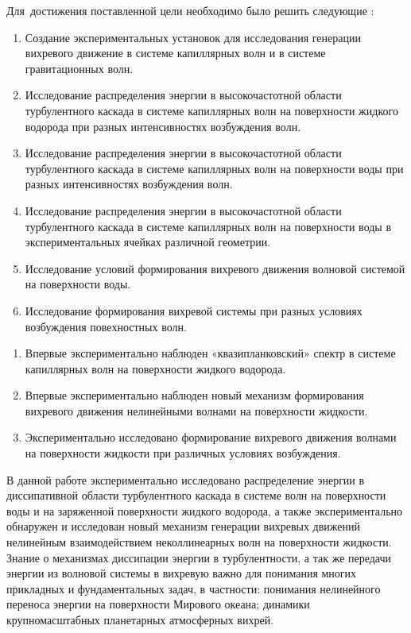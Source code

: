 Для~достижения поставленной цели необходимо было решить следующие {\tasks}:
\begin{enumerate}
	\item Создание экспериментальных установок для исследования генерации вихревого движение в системе капиллярных волн и в системе гравитационных волн.
	\item Исследование распределения энергии в высокочастотной области турбулентного каскада в системе капиллярных волн на поверхности жидкого водорода при разных интенсивностях возбуждения волн.
	\item Исследование распределения энергии в высокочастотной области турбулентного каскада в системе капиллярных волн на поверхности воды при разных интенсивностях возбуждения волн.
	\item Исследование распределения энергии в высокочастотной области турбулентного каскада в системе капиллярных волн на поверхности воды в экспериментальных ячейках различной геометрии.
	\item Исследование условий формирования вихревого движения волновой системой на поверхности воды.
	\item Исследование формирования вихревой системы при разных условиях
возбуждения повехностных волн.
\end{enumerate}

{\novelty}
\begin{enumerate}
	\item Впервые экспериментально наблюден «квазипланковский» спектр в системе капиллярных волн на поверхности жидкого водорода.
	\item Впервые экспериментально наблюден новый механизм формирования вихревого движения нелинейными волнами на поверхности жидкости.
	\item Экспериментально исследовано формирование вихревого движения волнами на поверхности жидкости при различных условиях возбуждения.
	
\end{enumerate}

{\influence}

В данной работе экспериментально исследовано распределение энергии в диссипативной области турбулентного каскада в системе волн на поверхности воды и на заряженной поверхности жидкого водорода, а также экспериментально обнаружен и исследован новый механизм генерации вихревых движений нелинейным взаимодействием неколлинеарных волн на поверхности жидкости. Знание о механизмах диссипации энергии в турбулентности, а так же передачи энергии из волновой системы в вихревую важно для понимания многих прикладных и фундаментальных задач, в частности: понимания нелинейного переноса энергии на поверхности Мирового океана; динамики крупномасштабных планетарных атмосферных вихрей.


